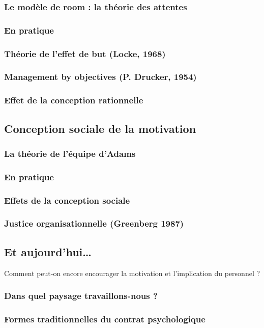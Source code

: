 \documentclass[12pt]{article}
\begin{document}
		\subsubsection{Le modèle de room : la théorie des attentes}
		\subsubsection{En pratique}
		\subsubsection{Théorie de l’effet de but (Locke, 1968)}
		\subsubsection{Management by objectives (P. Drucker, 1954)}
		\subsubsection{Effet de la conception rationnelle}
	\subsection{Conception sociale de la motivation}
		\subsubsection{La théorie de l’équipe d’Adams}
		\subsubsection{En pratique}
		\subsubsection{Effets de la conception sociale}
		\subsubsection{Justice organisationnelle (Greenberg 1987)}
	\subsection{Et aujourd’hui…}
		Comment peut-on encore encourager la motivation et l’implication du personnel ?
		\subsubsection{Dans quel paysage travaillons-nous ?}
		\subsubsection{Formes traditionnelles du contrat psychologique}
\end{document}
